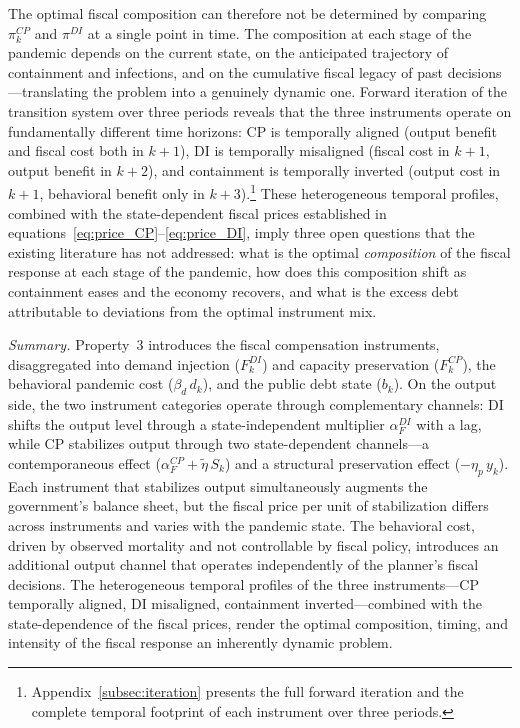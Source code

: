 The optimal fiscal composition can therefore not be determined by 
comparing $\pi^{CP}_k$ and $\pi^{DI}$ at a single point in time. 
The composition at each stage of the pandemic depends on the current 
state, on the anticipated trajectory of containment and infections, 
and on the cumulative fiscal legacy of past decisions---translating 
the problem into a genuinely dynamic one. Forward iteration of the 
transition system over three periods reveals that the three instruments operate on fundamentally different time horizons: CP is temporally aligned (output benefit and fiscal cost both in $k+1$), DI is temporally misaligned (fiscal cost in $k+1$, output benefit in $k+2$), and containment is temporally inverted (output cost in $k+1$, behavioral benefit only in $k+3$).\footnote{Appendix~\ref{subsec:iteration} presents the 
full forward iteration and the complete temporal footprint of each 
instrument over three periods.} These heterogeneous temporal 
profiles, combined with the state-dependent fiscal prices established in equations~\eqref{eq:price_CP}--\eqref{eq:price_DI}, imply three open questions that the existing literature has not addressed: what is the optimal \textit{composition} of the fiscal response at each stage of the pandemic, how does this composition shift as containment eases and the economy recovers, and what is the excess debt attributable to deviations from the optimal instrument mix.

\vspace{5mm}
\noindent\textit{Summary.} Property~3 introduces the fiscal compensation instruments, disaggregated into demand injection ($F^{DI}_k$) and capacity preservation ($F^{CP}_k$), the behavioral pandemic cost ($\beta_d\, d_k$), and the public debt state ($b_k$). On the output side, the two instrument categories operate through complementary channels: DI shifts the output level through a state-independent multiplier $\alpha^{DI}_F$ with a lag, while CP stabilizes output through two state-dependent channels---a contemporaneous effect ($\alpha^{CP}_F + \tilde{\eta}\, S_k$) and a structural preservation effect ($-\eta_p\, y_k$). Each instrument that stabilizes output simultaneously augments the government's balance sheet, but the fiscal price per unit of stabilization differs across instruments and varies with the pandemic state. The behavioral cost, driven by observed mortality and not controllable by fiscal policy, introduces an additional 
output channel that operates independently of the planner's fiscal decisions. The heterogeneous temporal profiles of the three instruments---CP temporally aligned, DI misaligned, containment inverted---combined with the state-dependence of the fiscal prices, render the optimal composition, timing, and intensity of the fiscal response an inherently dynamic problem.

